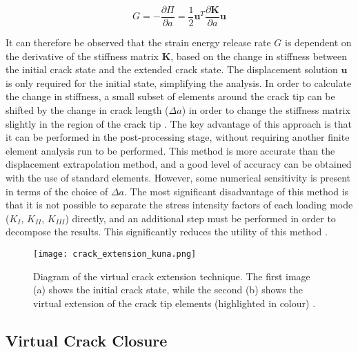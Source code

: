 \begin{equation}
    G = -\frac{\partial \Pi}{\partial a} = \frac{1}{2} \textbf{u}^T \frac{\partial \textbf{K}}{\partial a} \textbf{u}
    \label{eq:vce_2}
\end{equation}

It can therefore be observed that the strain energy release rate $G$ is dependent on the derivative of the stiffness matrix $\textbf{K}$, based on the change in stiffness between the initial crack state and the extended crack state. The displacement solution $\textbf{u}$ is only required for the initial state, simplifying the analysis. In order to calculate the change in stiffness, a small subset of elements around the crack tip can be shifted by the change in crack length ($\Delta a$) in order to change the stiffness matrix slightly in the region of the crack tip \cite{anderson_fracture_2017}. The key advantage of this approach is that it can be performed in the post-processing stage, without requiring another finite element analysis run to be performed. This method is more accurate than the displacement extrapolation method, and a good level of accuracy can be obtained with the use of standard elements. However, some numerical sensitivity is present in terms of the choice of $\Delta a$. The most significant disadvantage of this method is that it is not possible to separate the stress intensity factors of each loading mode ($K_I$, $K_{II}$, $K_{III}$) directly, and an additional step must be performed in order to decompose the results. This significantly reduces the utility of this method \cite{kuna_fe-techniques_2013}.

\begin{figure}[H]
    \centering
    \texttt{[image: crack\_extension\_kuna.png]}
    \caption{Diagram of the virtual crack extension technique. The first image (a) shows the initial crack state, while the second (b) shows the virtual extension of the crack tip elements (highlighted in colour) \cite{kuna_fe-techniques_2013}.}
    \label{fig:crack_extension_kuna}
\end{figure}

\subsection{Virtual Crack Closure}


